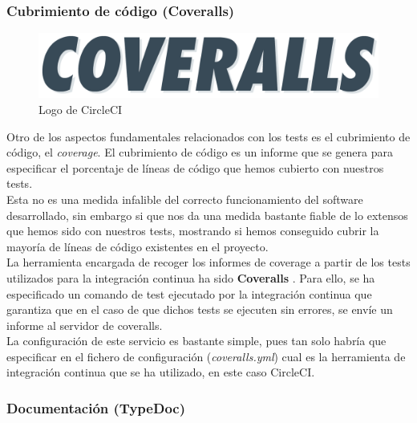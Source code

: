  \subsubsection{Cubrimiento de código (Coveralls)}
 
  \begin{figure}[ht]
    \centering
    \includegraphics[scale=0.3]{mem/images/cap-4/4.1.2(desarrollo)/coveralls-logo.png}
    \caption{Logo de CircleCI}
    \label{fig:circleci}
\end{figure}
 
 Otro de los aspectos fundamentales relacionados con los tests es el cubrimiento de código, el \textit{coverage}. El cubrimiento de código es un informe que se genera para especificar el porcentaje de líneas de código que hemos cubierto con nuestros tests. \\
 
 Esta no es una medida infalible del correcto funcionamiento del software desarrollado, sin embargo si que nos da una medida bastante fiable de lo extensos que hemos sido con nuestros tests, mostrando si hemos conseguido cubrir la mayoría de líneas de código existentes en el proyecto.\\
 
 La herramienta encargada de recoger los informes de coverage a partir de los tests utilizados para la integración continua ha sido \textbf{Coveralls} \cite{coveralls}. Para ello, se ha especificado un comando de test ejecutado por la integración continua que garantiza que en el caso de que dichos tests se ejecuten sin errores, se envíe un informe al servidor de coveralls. \\
 
 La configuración de este servicio es bastante simple, pues tan solo habría que especificar en el fichero de configuración (\textit{coveralls.yml}) cual es la herramienta de integración continua que se ha utilizado, en este caso CircleCI.
 
 \subsubsection{Documentación (TypeDoc)}
 
